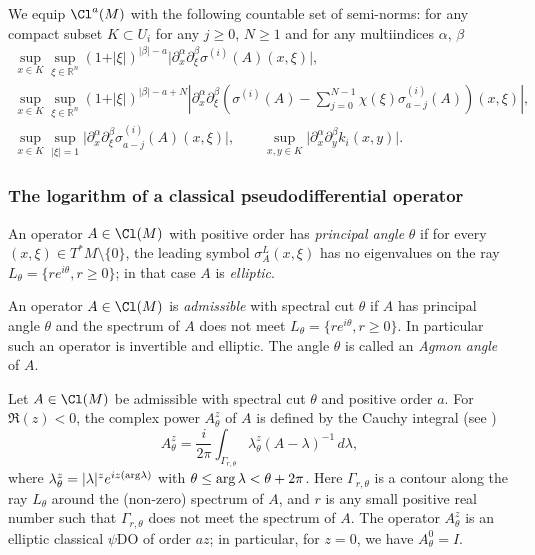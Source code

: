 We equip ${\Cl}^{a}(M)$ with the following countable set of semi-norms: for any compact subset $K\subset U_i$ for any $j\geq 0$, $N\geq 1$ and for any multiindices $\alpha$, $\beta$
\begin{gather*}
 \sup\limits_{x\in K}\sup\limits_{
  \xi\in\mathbb{R}^n}(1+\vert\xi\vert)^{\vert\beta\vert-a}
  \big|\partial_x^{\alpha}\partial_{\xi}^{\beta} \sigma^{(i)}(A)(x,\xi)\big|,\\
 \sup\limits_{x\in K}\sup\limits_{
  \xi\in\mathbb{R}^n}(1+\vert\xi\vert)^{\vert\beta\vert-a+N}
  \left|\partial_x^{\alpha}\partial_{\xi}^{\beta} \left(\sigma^{(i)}(A)-\sum_{j=0}^{N-1}\chi(\xi)  \sigma_{a-j}^{(i)}(A)\right)(x,\xi)\right|,\\
 \sup\limits_{x\in K}\sup\limits_{ \vert\xi\vert=1}
  \big|\partial_x^{\alpha}\partial_{\xi}^{\beta}\sigma_{a-j}^{(i)}(A)(x,\xi)\big|,\qquad
 \sup\limits_{x,y\in K}
  \big|\partial_x^{\alpha}\partial_{y}^{\beta} k_i(x,y)\big|.
\end{gather*}

\subsubsection{The logarithm of a classical pseudodif\/ferential operator}

An operator $A \in \Cl(M)$ with positive order has \emph{principal angle} $\theta$ if for every $(x, \xi)\in T^*M\setminus\{0\}$, the leading symbol $\sigma_A^L(x, \xi)$ has no eigenvalues on the ray $L_\theta=\{re^{i\theta}, r\geq 0\}$; in that case $A$ is \emph{elliptic}.
\begin{definition}
An operator $A\in \Cl(M)$ is \emph{admissible} with spectral cut $\theta$ if $A$ has principal angle $\theta$ and the spectrum of $A$ does not meet $L_{\theta}=\{re^{i\theta}, r\geq 0\}$. In particular such an operator is invertible and elliptic. The angle $\theta$ is called an \emph{Agmon angle} of $A$.
\end{definition}
Let $A\in \Cl(M)$ be admissible with spectral cut $\theta$ and positive order $a$. For $\Re(z)<0$, the complex power $A_{\theta}^z$ of $A$ is
def\/ined by the Cauchy integral (see \cite{seeley})
\[
A_\theta^{z}=\frac{i}{2\pi} \int_{\Gamma_{r,\theta}} \lambda_\theta^{z} (A-\lambda)^{-1}\, d\lambda,
\]
where $\lambda_\theta^z= \vert \lambda\vert^z e^{iz {(\rm arg}\lambda)}$ with  $\theta\leq {\rm arg}\,\lambda<\theta+2\pi$. Here $\Gamma_{r,\theta}$ is a contour along the ray $L_\theta$ around the (non-zero) spectrum of $A$, and $r$ is any small positive real number such that $\Gamma_{r,\theta}$ does not meet the spectrum of $A$. The operator $A_{\theta}^z$ is an elliptic classical $\psi$DO of order $az$; in particular, for $z=0$, we have $ A_{\theta}^0 = I$.

